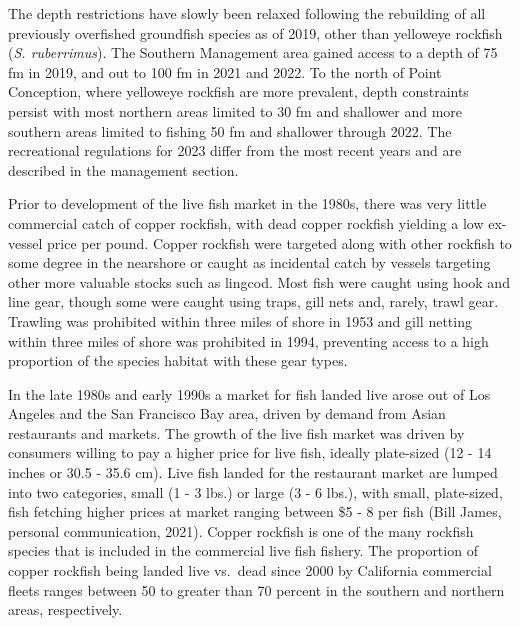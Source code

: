\documentclass[11pt,
  english,
  letterpaper,
]{article}
\begin{document}
The depth restrictions have slowly been relaxed following the rebuilding of all previously overfished groundfish species as of 2019, other than yelloweye rockfish (\emph{S. ruberrimus}). The Southern Management area gained access to a depth of 75 fm in 2019, and out to 100 fm in 2021 and 2022. To the north of Point Conception, where yelloweye rockfish are more prevalent, depth constraints persist with most northern areas limited to 30 fm and shallower and more southern areas limited to fishing 50 fm and shallower through 2022. The recreational regulations for 2023 differ from the most recent years and are described in the management section.

Prior to development of the live fish market in the 1980s, there was very little commercial catch of copper rockfish, with dead copper rockfish yielding a low ex-vessel price per pound. Copper rockfish were targeted along with other rockfish to some degree in the nearshore or caught as incidental catch by vessels targeting other more valuable stocks such as lingcod. Most fish were caught using hook and line gear, though some were caught using traps, gill nets and, rarely, trawl gear. Trawling was prohibited within three miles of shore in 1953 and gill netting within three miles of shore was prohibited in 1994, preventing access to a high proportion of the species habitat with these gear types.

In the late 1980s and early 1990s a market for fish landed live arose out of Los Angeles and the San Francisco Bay area, driven by demand from Asian restaurants and markets. The growth of the live fish market was driven by consumers willing to pay a higher price for live fish, ideally plate-sized (12 - 14 inches or 30.5 - 35.6 cm). Live fish landed for the restaurant market are lumped into two categories, small (1 - 3 lbs.) or large (3 - 6 lbs.), with small, plate-sized, fish fetching higher prices at market ranging between \$5 - 8 per fish (Bill James, personal communication, 2021). Copper rockfish is one of the many rockfish species that is included in the commercial live fish fishery. The proportion of copper rockfish being landed live vs.~dead since 2000 by California commercial fleets ranges between 50 to greater than 70 percent in the southern and northern areas, respectively.
\end{document}
